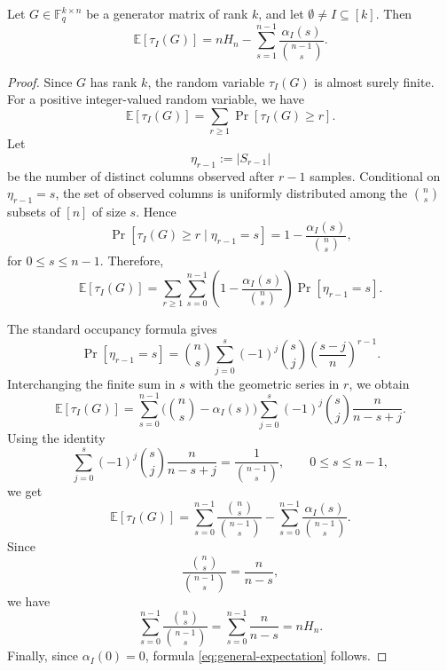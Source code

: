 \documentclass[10pt,a4paper]{amsart}
\newcommand{\E}{\mathbb{E}}
\newcommand{\F}{\mathbb{F}}
\begin{document}
\begin{lemma}\label{lem:general-expectation}
Let $G\in \F_q^{k\times n}$ be a generator matrix of rank $k$, and let $\emptyset\neq I\subseteq [k]$. Then
\begin{equation}\label{eq:general-expectation}
\E[\tau_I(G)]
= nH_n-\sum_{s=1}^{n-1}\frac{\alpha_I(s)}{\binom{n-1}{s}}.
\end{equation}
\end{lemma}

\begin{proof}
Since $G$ has rank $k$, the random variable $\tau_I(G)$ is almost surely finite. For a positive integer-valued random variable, we have
\[
\E[\tau_I(G)]
=
\sum_{r\geq 1}\Pr[\tau_I(G)\geq r].
\]
Let
\[
\eta_{r-1}:=|S_{r-1}|
\]
be the number of distinct columns observed after $r-1$ samples. Conditional on $\eta_{r-1}=s$, the set of observed columns is uniformly distributed among the $\binom ns$ subsets of $[n]$ of size $s$. Hence
\[
\Pr[\tau_I(G)\geq r\mid \eta_{r-1}=s]
=
1-\frac{\alpha_I(s)}{\binom ns},
\]
for $0\leq s\leq n-1$. Therefore,
\[
\E[\tau_I(G)]
=
\sum_{r\geq 1}
\sum_{s=0}^{n-1}
\left(1-\frac{\alpha_I(s)}{\binom ns}\right)
\Pr[\eta_{r-1}=s].
\]

The standard occupancy formula gives
\[
\Pr[\eta_{r-1}=s]
=
\binom ns
\sum_{j=0}^s
(-1)^j
\binom sj
\left(\frac{s-j}{n}\right)^{r-1}.
\]
Interchanging the finite sum in $s$ with the geometric series in $r$, we obtain
\[
\E[\tau_I(G)]
=
\sum_{s=0}^{n-1}
\bigl(\binom ns-\alpha_I(s)\bigr)
\sum_{j=0}^s
(-1)^j
\binom sj
\frac{n}{n-s+j}.
\]
Using the identity
\[
\sum_{j=0}^s
(-1)^j
\binom sj
\frac{n}{n-s+j}
=
\frac{1}{\binom{n-1}{s}},
\qquad 0\leq s\leq n-1,
\]
we get
\[
\E[\tau_I(G)]
=
\sum_{s=0}^{n-1}
\frac{\binom ns}{\binom{n-1}{s}}
-
\sum_{s=0}^{n-1}
\frac{\alpha_I(s)}{\binom{n-1}{s}}.
\]
Since
\[
\frac{\binom ns}{\binom{n-1}{s}}=\frac{n}{n-s},
\]
we have
\[
\sum_{s=0}^{n-1}
\frac{\binom ns}{\binom{n-1}{s}}
=
\sum_{s=0}^{n-1}\frac{n}{n-s}
=
nH_n.
\]
Finally, since $\alpha_I(0)=0$, formula \eqref{eq:general-expectation} follows.
\end{proof}
\end{document}
